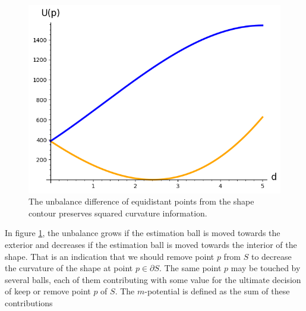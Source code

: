 \begin{figure}[h!]
\begin{minipage}{0.25\textwidth}
\end{minipage}%
\begin{minipage}{0.75\textwidth}
\includegraphics[scale=0.75]{figures/appendix-potential-elastica/potential-elastica-plot.png}
\end{minipage}
\caption{The unbalance difference of equidistant points from the shape contour preserves squared curvature information.}
\label{fig:unbalance-plot}
\end{figure}


In figure \ref{fig:unbalance-plot}, the unbalance grows if the estimation ball is moved towards the exterior and decreases if the estimation ball is moved towards the interior of the shape. That is an indication that we should remove point $p$ from $S$ to decrease the curvature of the shape at point $p \in \partial S$. The same point $p$ may be touched by several balls, each of them contributing with some value for the ultimate decision of keep or remove point $p$ of $S$. The $m$-potential is defined as the sum of these contributions


